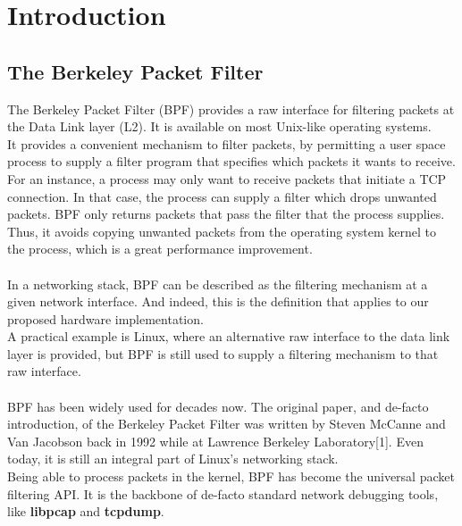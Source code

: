 \documentclass{l4proj}
\begin{document}
\educationalconsent
%
%
\tableofcontents

\chapter{Introduction}

\section{The Berkeley Packet Filter}
The Berkeley Packet Filter (BPF) provides a raw interface for filtering packets at the Data Link layer (L2). It is available on most Unix-like operating systems.\\
It provides a convenient mechanism to filter packets, by permitting a user space process to supply a filter program that specifies which packets it wants to receive. For an instance, a process may only want to receive packets that initiate a TCP connection. In that case, the process can supply a filter which drops unwanted packets. BPF only returns packets that pass the filter that the process supplies. Thus, it avoids copying unwanted packets from the operating system kernel to the process, which is a great performance improvement.\\\\
In a networking stack, BPF can be described as the filtering mechanism at a given network interface. And indeed, this is the definition that applies to our proposed hardware implementation.\\
A practical example is Linux, where an alternative raw interface to the data link layer is provided, but BPF is still used to supply a filtering mechanism to that raw interface.\\\\
BPF has been widely used for decades now. The original paper, and de-facto introduction, of the Berkeley Packet Filter was written by Steven McCanne and Van Jacobson back in 1992 while at Lawrence Berkeley Laboratory[1]. Even today, it is still an integral part of Linux's networking stack.\\
Being able to process packets in the kernel, BPF has become the universal packet filtering API. It is the backbone of de-facto standard network debugging tools, like \textbf{libpcap} and \textbf{tcpdump}.\\
\end{document}
